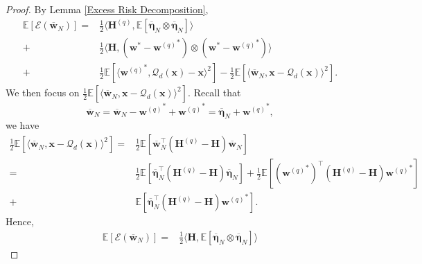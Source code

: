 \documentclass[11pt, letterpaper]{article}
\begin{document}
\begin{proof}
    By Lemma \ref{Excess Risk Decomposition},
    \begin{equation*}
        \begin{aligned}
            \mathbb{E}[\mathcal{E}(\overline{\mathbf{w}}_N)]=&\frac{1}{2}\langle\mathbf{H}^{(q)},\mathbb{E}[\overline{\boldsymbol{\eta}}_N\otimes\overline{\boldsymbol{\eta}}_N]\rangle\\
            +&\frac{1}{2}\langle\mathbf{H},({\mathbf{w}}^*-{\mathbf{w}^{(q)}}^*)\otimes({\mathbf{w}}^*-{\mathbf{w}^{(q)}}^*)\rangle\\
            +&\frac{1}{2}\mathbb{E}\left[\langle {\mathbf{w}^{(q)}}^*,\mathcal{Q}_d(\mathbf{x})-\mathbf{x}\rangle^2\right]-\frac{1}{2}\mathbb{E}\left[\langle \overline{\mathbf{w}}_N ,\mathbf{x}-\mathcal{Q}_d(\mathbf{x}) \rangle^2\right].
        \end{aligned}
    \end{equation*}
    We then focus on $\frac{1}{2}\mathbb{E}\left[\langle \overline{\mathbf{w}}_N ,\mathbf{x}-\mathcal{Q}_d(\mathbf{x}) \rangle^2\right]$. Recall that
    \begin{equation*}
        \overline{\mathbf{w}}_N=\overline{\mathbf{w}}_N-{\mathbf{w}^{(q)}}^*+{\mathbf{w}^{(q)}}^*=\overline{\boldsymbol{\eta}}_N+{\mathbf{w}^{(q)}}^*,
    \end{equation*}
    we have
    \begin{equation*}
        \begin{aligned}
            \frac{1}{2}\mathbb{E}\left[\langle \overline{\mathbf{w}}_N ,\mathbf{x}-\mathcal{Q}_d(\mathbf{x}) \rangle^2\right]=&\frac{1}{2}\mathbb{E}\left[\overline{\mathbf{w}}_N^\top \left(\mathbf{H}^{(q)}-\mathbf{H}\right)\overline{\mathbf{w}}_N\right]\\
            =&\frac{1}{2}\mathbb{E}\left[\overline{\boldsymbol{\eta}}_N^\top \left(\mathbf{H}^{(q)}-\mathbf{H}\right)\overline{\boldsymbol{\eta}}_N\right]+\frac{1}{2}\mathbb{E}\left[\left({\mathbf{w}^{(q)}}^*\right)^\top \left(\mathbf{H}^{(q)}-\mathbf{H}\right){\mathbf{w}^{(q)}}^*\right]\\
            +&\mathbb{E}\left[\overline{\boldsymbol{\eta}}_N^\top \left(\mathbf{H}^{(q)}-\mathbf{H}\right){\mathbf{w}^{(q)}}^*\right].
        \end{aligned}
    \end{equation*}
    Hence,
    \begin{equation}
        \label{eq: a6}
        \begin{aligned}
            \mathbb{E}[\mathcal{E}(\overline{\mathbf{w}}_N)]=&\frac{1}{2}\langle\mathbf{H},\mathbb{E}[\overline{\boldsymbol{\eta}}_N\otimes\overline{\boldsymbol{\eta}}_N]\rangle

\end{aligned}
\end{equation}
\end{proof}
\end{document}
